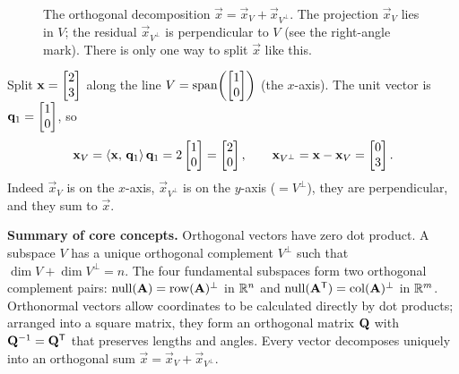 \begin{figure}[H]
\centering
{}
\caption{The orthogonal decomposition $\vec x=\vec x_V+\vec x_{V^{\perp}}$. The projection
$\vec x_V$ lies in $V$; the residual $\vec x_{V^{\perp}}$ is perpendicular to $V$ (see the
right-angle mark). There is only one way to split $\vec x$ like this.}
\label{ch17:decomp-pic}
\end{figure}

\begin{example}\label{ch17:split-example}
Split $\mathbf{x}=\begin{bmatrix}2\\3\end{bmatrix}$ along the line $V=\operatorname{span}\!\left(\begin{bmatrix}1\\0\end{bmatrix}\right)$ (the $x$-axis). The
unit vector is $\mathbf{q}_1=\begin{bmatrix}1\\0\end{bmatrix}$, so
\[
  \mathbf{x}_V = \langle \mathbf{x},\, \mathbf{q}_1 \rangle\,\mathbf{q}_1 = 2\begin{bmatrix}1\\0\end{bmatrix}=\begin{bmatrix}2\\0\end{bmatrix},
  \qquad
  \mathbf{x}_{V^\perp} = \mathbf{x}-\mathbf{x}_V = \begin{bmatrix}0\\3\end{bmatrix}.
\]
Indeed $\vec x_V$ is on the $x$-axis, $\vec x_{V^\perp}$ is on the $y$-axis ($=V^\perp$), they are
perpendicular, and they sum to $\vec x$.
\end{example}

\begin{focusbox}
\textbf{Summary of core concepts.} Orthogonal vectors have zero dot product.
A subspace $V$ has a unique orthogonal complement $V^\perp$ such that $\dim V+\dim V^\perp=n$.
The four fundamental subspaces form two orthogonal complement pairs:
$\operatorname{null}(\mathbf{A})=\operatorname{row}(\mathbf{A})^\perp$ in $\mathbb{R}^n$ and $\operatorname{null}(\mathbf{A}^{\mathsf{T}})=\operatorname{col}(\mathbf{A})^\perp$ in $\mathbb{R}^m$.
Orthonormal vectors allow coordinates to be calculated directly by dot products;
arranged into a square matrix, they form an orthogonal matrix $\mathbf{Q}$ with $\mathbf{Q}^{-1}=\mathbf{Q}^{\mathsf{T}}$
that preserves lengths and angles. Every vector decomposes uniquely into an orthogonal sum
$\vec{x} = \vec{x}_V + \vec{x}_{V^\perp}$.
\end{focusbox}

